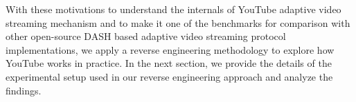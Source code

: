 With these motivations to understand the internals of YouTube adaptive video streaming mechanism and to make it one of the benchmarks for comparison with other open-source \ac{DASH} based adaptive video streaming protocol implementations, we apply a reverse engineering methodology to explore how YouTube works in practice. In the next section, we provide the details of the experimental setup used in our reverse engineering approach and analyze the findings.

